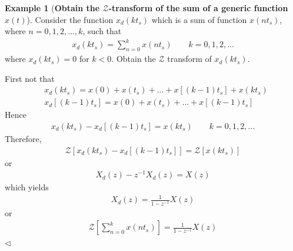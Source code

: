 \documentclass[11pt,a4paper,oneside]{book}
\numberwithin{equation}{section}
\theoremstyle{it}
\theoremstyle{definition}
\newtheorem{example}{Example}[chapter]
\begin{document}
\begin{example}[\textbf{Obtain the $\mathcal{Z}$-transform of the sum of a 
generic function $x(t)$}]

Consider the function $x_d(kt_s)$ which is a sum of function $x(nt_s)$, where $n=0,1,2,...,k$, such that
\begin{equation*}
	\begin{split}
		x_d(kt_s) = \sum_{n=0}^{k}x(nt_s) \quad\quad k=0,1,2,...
	\end{split}
\end{equation*} 
where $x_d(kt_s)=0$ for $k<0$. Obtain the $\mathcal{Z}$ transform of $x_d(kt_s)$.

First not that
\begin{equation*}
	\begin{split}
		&x_d(kt_s) = x(0)+x(t_s)+...+x\left[(k-1)t_s\right]+x(kt_s) \\[6pt]
		&x_d\left[(k-1)t_s\right] = x(0)+x(t_s)+...+x\left[(k-1)t_s\right]
	\end{split}
\end{equation*} 
Hence 
\begin{equation*}
	\begin{split}
		x_d(kt_s) - x_d\left[(k-1)t_s\right] = x(kt_s) \quad\quad k=0,1,2,...
	\end{split}
\end{equation*} 
Therefore,
\begin{equation*}
	\begin{split}
		\mathcal{Z} \left[ x_d(kt_s) - x_d\left[(k-1)t_s\right] \right] = \mathcal{Z} \left[ x(kt_s) \right]
	\end{split}
\end{equation*}
or
\begin{equation*}
	\begin{split}
		X_d(z)-z^{-1}X_d(z) = X(z)
	\end{split}
\end{equation*}
which yields 
\begin{equation*}
	\begin{split}
		X_d(z) = \frac{1}{1-z^{-1}}X(z)
	\end{split}
\end{equation*}
or 
\begin{equation}\label{zsum}
	\begin{split}
		\mathcal{Z} \left[ \sum_{n=0}^{k}x(nt_s) \right] = \frac{1}{1-z^{-1}}X(z)
	\end{split}
\end{equation}
$\triangleleft$ \end{example}
\end{document}

